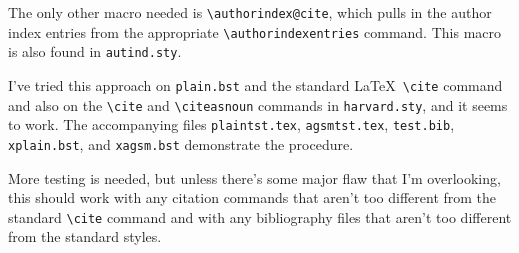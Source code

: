 \documentclass{article}
\begin{document}
The only other macro needed is \verb+\authorindex@cite+, which pulls
in the author index entries from the appropriate
\verb+\authorindexentries+ command.  This macro is also found in \texttt{autind.sty}.

I've tried this approach on \texttt{plain.bst} and the standard
\LaTeX\ \verb+\cite+ command and also on the \verb+\cite+ and
\verb+\citeasnoun+ commands in \texttt{harvard.sty}, and it seems to
work.  The accompanying files \texttt{plaintst.tex},
\texttt{agsmtst.tex}, \texttt{test.bib}, \texttt{xplain.bst}, and
\texttt{xagsm.bst} demonstrate the procedure.

More testing is needed, but unless there's some major flaw that I'm
overlooking, this should work with any citation commands that aren't
too different from the standard \verb+\cite+ command and with any
bibliography files that aren't too different from the standard styles.
\end{document}
